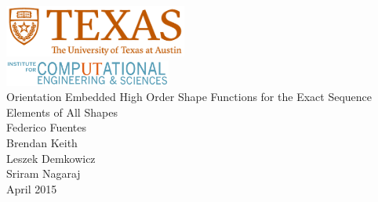\begin{titlepage}
\thispagestyle{empty}
\begin{center}


{}~\\[0.4cm]
\includegraphics[width=0.45\textwidth]{./figures/UTAustinPrimarySignature.pdf}~\\[0.5cm]
\includegraphics[width=0.41\textwidth]{./figures/ICESWordmarkTealBlue.pdf}~\\[3cm] 


\linespread{1.8}\selectfont
{ \huge Orientation Embedded High Order Shape Functions for the Exact Sequence Elements of All Shapes } \\[3cm]




\linespread{1.2}\selectfont
{\Large Federico Fuentes}\\[0.1cm]
{\Large Brendan Keith}\\[0.1cm]
{\Large Leszek Demkowicz}\\[0.1cm]
{\Large Sriram Nagaraj}\\[4cm]

{\Large April 2015}\\[1.0cm]
\vfill

\end{center}

\end{titlepage}
